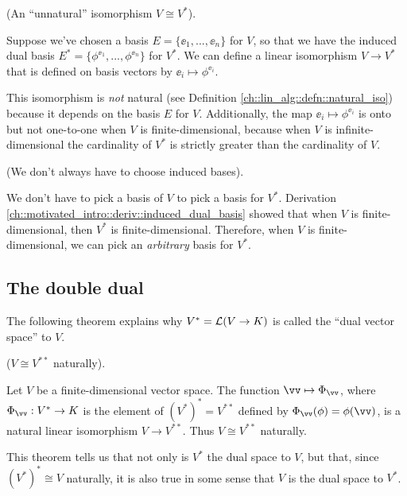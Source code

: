 \begin{remark}
\label{ch::motivated_intro::rmk::unnatural_iso_V_V*}
    (An ``unnatural'' isomorphism $V \cong V^*$).
    
    Suppose we've chosen a basis $E = \{\ee_1, ..., \ee_n\}$ for $V$, so that we have the induced dual basis ${E^* = \{\phi^{\ee_1}, ..., \phi^{\ee_n}\}}$ for $V^*$. We can define a linear isomorphism $V \rightarrow V^*$ that is defined on basis vectors by $\ee_i \mapsto \phi^{\ee_i}$.
    
    This isomorphism is \textit{not} natural (see Definition \ref{ch::lin_alg::defn::natural_iso}) because it depends on the basis $E$ for $V$. Additionally, the map $\ee_i \mapsto \phi^{\ee_i}$ is onto but not one-to-one when $V$ is finite-dimensional, because when $V$ is infinite-dimensional the cardinality of $V^*$ is strictly greater than the cardinality of $V$.    
\end{remark}

\begin{remark}
    (We don't always have to choose induced bases).
    
    We don't have to pick a basis of $V$ to pick a basis for $V^*$. Derivation \ref{ch::motivated_intro::deriv::induced_dual_basis} showed that when $V$ is finite-dimensional, then $V^*$ is finite-dimensional. Therefore, when $V$ is finite-dimensional, we can pick an \textit{arbitrary} basis for $V^*$.
\end{remark}

\subsection*{The double dual}

The following theorem explains why $V^* = \mathcal{L}(V \rightarrow K)$ is called the ``dual vector space'' to $V$.
\begin{theorem}
\label{ch::motivated_intro::thm::V_iso_double_dual}
    ($V \cong V^{**}$ naturally). 
    
    Let $V$ be a finite-dimensional vector space. The function $\vv \mapsto \Phi_\vv$, where $\Phi_\vv:V^* \rightarrow K$ is the element of $(V^*)^* = V^{**}$ defined by $\Phi_\vv(\phi) = \phi(\vv)$, is a natural linear isomorphism $V \rightarrow V^{**}$. Thus $V \cong V^{**}$ naturally.

    This theorem tells us that not only is $V^*$ the dual space to $V$, but that, since $(V^*)^* \cong V$ naturally, it is also true in some sense that $V$ is the dual space to $V^*$.
\end{theorem}


